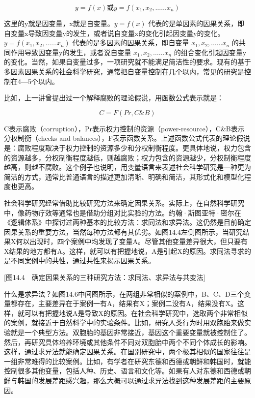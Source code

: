 \[y = f(x) 或 y = f(x_1,x_2,……x_n)\]

这里的y就是因变量，x就是自变量。$y = f(x)$ 代表的是单因素的因果关系，即自变量x导致因变量y的发生，或者说自变量x的变化引起因变量y的变化。$y = f(x_1,x_2,……x_n)$ 代表的是多因素的因果关系，即自变量 $x_1,x_2,……x_n$ 的共同作用导致因变量y的发生，或者说自变量 $x_1,x_2,……x_n$ 的组合变化引起因变量y的变化。当然，如果自变量过多，一项研究就不能满足简洁性的要求。现有的基于多因素因果关系的社会科学研究，通常把自变量控制在几个以内，常见的研究是控制在4—5个以内。

比如，上一讲曾提出过一个解释腐败的理论假说，用函数公式表示就是：

\[C = F(Pr, C\&B)\]

C表示腐败（corruption），Pr表示权力控制的资源（power-resource），C\&B表示分权制衡（checks and balances），F表示函数关系。上述函数公式代表的理论假说是：腐败程度取决于权力控制的资源多少和分权制衡程度。更具体地说，权力包含的资源越多，分权制衡程度越低，则越腐败；权力包含的资源越少，分权制衡程度越高，则越不腐败。这个例子也说明，用变量语言来表述社会科学研究是一种更为简洁的方式，通常比普通语言的描述更加清晰、明确和简洁，其形式化和模型化程度也更高。


社会科学研究经常借助比较研究方法来确定因果关系。实际上，在自然科学研究中，像药物疗效等通常也是借助分组对比实验的方法。约翰·斯图亚特·密尔在《逻辑体系》中探讨过两种基本的比较方法：求同法和求异法。这仍然是目前确定因果关系的重要方法，当然每种方法都有其优劣。如图14.4左侧图所示，当研究结果X何以出现时，四个案例中均发现了变量A。尽管其他变量差异很大，但只要有X结果的地方都有A。这样，就可以有把握地说，A是引起X的原因。求同法寻求的是不同案例中的共性，通过共性来揭示因果关系。

[图14.4　确定因果关系的三种研究方法：求同法、求异法与共变法]

什么是求异法？如图14.6中间图所示，在两组非常相似的案例中，B、C、D三个变量都存在，主要差异在于案例一有A，结果有X；案例二没有A，结果没有X。这样，就可以有把握地说A是导致X的原因。在社会科学研究中，选取两个非常相似的案例，就接近于自然科学中的实验条件。比如，研究人类行为时用双胞胎来做实验就是一个典型方法。双胞胎的基因非常接近，基因这个重要变量就被控制住了。然后，再研究具体培养环境或其他条件不同对双胞胎中两个不同个体成长的影响。这样，通过求异法就能确定因果关系。在国别研究中，两个极其相似的国家往往是一组非常难得的比较案例。比如，有学者在研究东德和西德或朝鲜和韩国时，就能控制很多其他变量，包括人种、历史、语言和文化等。如果有人对东德和西德或朝鲜与韩国的发展差距感兴趣，那么大概可以通过求异法找到这种发展差距的主要原因。

